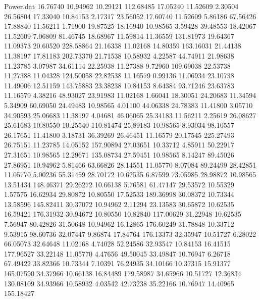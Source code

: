 \begin{filecontents}{Power.dat}
  16.76740   10.94962   10.29121  112.68485
  17.05240   11.52609    2.30504   26.56804
  17.33040   10.84153    2.17317   23.56052
  17.60740   11.52609    5.86186   67.56426
  17.88840   11.56211    1.71900   19.87525
  18.16940   10.98565    3.59428   39.48553
  18.42067   11.52609    7.06809   81.46745
  18.68967   11.59814   11.36559  131.81973
  19.64367   11.09373   20.60520  228.58864
  21.16338   11.02168   14.80359  163.16031
  21.44138   11.38197   17.81183  202.73370
  21.71538   10.58932    4.22587   44.74911
  21.98638   11.23785    3.07987   34.61114
  22.25938   11.27388    9.72960  109.69038
  22.53738   11.27388   11.04328  124.50058
  22.82538   11.16579    0.99136   11.06934
  23.10738   11.49006   12.51159  143.75883
  23.38238   10.84153    8.64384   93.71246
  23.63783   11.16579    4.38216   48.93027
  23.91983   11.02168    1.66041   18.30051
  24.20683   11.34594    5.34909   60.69050
  24.49483   10.98565    4.01100   44.06338
  24.78383   11.41800    3.05710   34.90593
  25.06683   11.38197    4.04681   46.06065
  25.34183   11.56211    2.25619   26.08627
  25.61683   10.80550   10.25540  110.81474
  25.89183   10.98565    8.93034   98.10557
  26.17651   11.41800    3.18731   36.39269
  26.46451   11.16579   20.17545  225.27493
  26.75151   11.23785   14.05152  157.90894
  27.03651   10.33712    4.85911   50.22917
  27.31651   10.98565   12.29671  135.08734
  27.59451   10.98565    8.14247   89.45026
  27.86951   10.94962    5.81466   63.66826
  28.14551   11.05770    8.07084   89.24499
  28.42851   11.05770    5.00236   55.31459
  28.70172   10.62535    6.87599   73.05985
  28.98872   10.98565   13.51434  148.46371
  29.26272   10.66138    5.76581   61.47147
  29.53572   10.55329    1.57575   16.62934
  29.80872   10.80550   17.52533  189.36998
  30.08372   10.73344   13.58596  145.82411
  30.37072   10.94962    2.11294   23.13583
  30.65872   10.62535   16.59421  176.31932
  30.94672   10.80550   10.82840  117.00629
  31.22948   10.62535    7.56947   80.42826
  31.50648   10.94962   16.12865  176.60249
  31.78848   10.33712    9.53915   98.60736
  32.07447    9.86874   17.84764  176.13373
  32.35947   10.51727    6.28022   66.05073
  32.64648   11.02168    4.74028   52.24586
  32.93547   10.84153   16.41515  177.96527
  33.22148   11.05770    4.47656   49.50045
  33.49847   10.76947    6.26718   67.49422
  33.82366   10.73344    7.10391   76.24935
  34.10166   10.37315   15.91377  165.07590
  34.37966   10.66138   16.84489  179.58987
  34.65966   10.51727   12.36834  130.08109
  34.93966   10.58932    4.03542   42.73238
  35.22166   10.76947   14.40965  155.18427

\end{filecontents}
